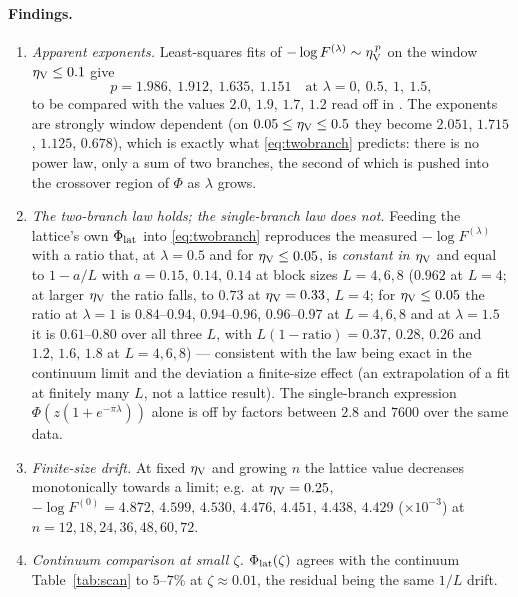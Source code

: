 \paragraph{Findings.}
\begin{enumerate}[label=(L\arabic*),leftmargin=2.6em]
\item \emph{Apparent exponents.}  Least-squares fits of
$-\log F^{(\lambda)}\sim\eta_{\rm V}^{\,p}$ on the window $\eta_{\rm V}\le0.1$ give
\[
 p=1.986,\ 1.912,\ 1.635,\ 1.151\quad\text{at }\lambda=0,\ 0.5,\ 1,\ 1.5,
\]
to be compared with the values $2.0$, $1.9$, $1.7$, $1.2$ read off in \cite{VWZ}.
The exponents are strongly window dependent (on $0.05\le\eta_{\rm V}\le0.5$ they
become $2.051$, $1.715$, $1.125$, $0.678$), which is exactly what
\eqref{eq:twobranch} predicts: there is no power law, only a sum of two branches,
the second of which is pushed into the crossover region of $\Phi$ as $\lambda$
grows.
\item \emph{The two-branch law holds; the single-branch law does not.}  Feeding
the lattice's own $\Phi_{\rm lat}$ into \eqref{eq:twobranch} reproduces the
measured $-\log F^{(\lambda)}$ with a ratio that, at $\lambda=0.5$ and for $\eta_{\rm V}\le0.05$, is \emph{constant in
$\eta_{\rm V}$} and equal to $1-a/L$ with $a=0.15,\,0.14,\,0.14$ at block sizes $L=4,6,8$ ($0.962$ at $L=4$; at larger $\eta_{\rm V}$ the ratio falls, to $0.73$ at $\eta_{\rm V}=0.33$, $L=4$; for $\eta_{\rm V}\le0.05$ the ratio at $\lambda=1$ is $0.84$--$0.94$, $0.94$--$0.96$, $0.96$--$0.97$ at $L=4,6,8$ and at $\lambda=1.5$ it is $0.61$--$0.80$ over all three $L$, with $L(1-\text{ratio})=0.37,\,0.28,\,0.26$ and $1.2,\,1.6,\,1.8$ at $L=4,6,8$) ---
consistent with the law being exact in the continuum limit and the deviation a finite-size effect
(an extrapolation of a fit at finitely many $L$, not a lattice result).  The single-branch expression
$\Phi(z(1+e^{-\pi\lambda}))$ alone is off by factors between $2.8$ and $7600$ over
the same data.
\item \emph{Finite-size drift.}  At fixed $\eta_{\rm V}$ and growing $n$ the
lattice value decreases monotonically towards a limit; e.g.\ at
$\eta_{\rm V}=0.25$, $-\log F^{(0)}=4.872,\,4.599,\,4.530,\,4.476,\,4.451,\,4.438,
\,4.429$ ($\times10^{-3}$) at $n=12,18,24,36,48,60,72$.
\item \emph{Continuum comparison at small $\zeta$.}  $\Phi_{\rm lat}(\zeta)$ agrees
with the continuum Table~\ref{tab:scan} to $5$--$7\%$ at $\zeta\approx0.01$, the
residual being the same $1/L$ drift.
\end{enumerate}

